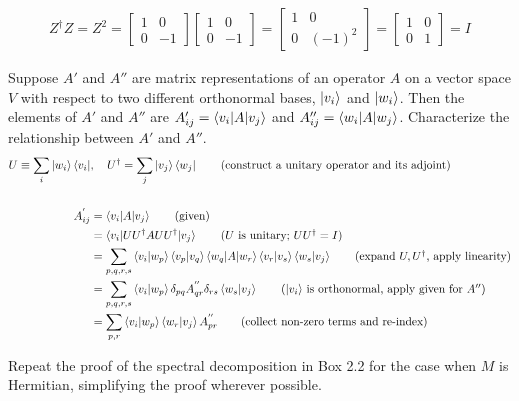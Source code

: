 \begin{align*}
	Z^\dagger Z = Z^2 = \begin{bmatrix}
		1 & 0 \\
		0 & -1
	\end{bmatrix}
	\begin{bmatrix}
		1 & 0 \\
		0 & -1
	\end{bmatrix}
	= \begin{bmatrix}
		1 & 0 \\
		0 & (-1)^2
	\end{bmatrix}
	= \begin{bmatrix}
		1 & 0 \\
		0 & 1
	\end{bmatrix} = I
\end{align*}

 Suppose $A'$ and $A''$ are matrix representations of an operator $A$ on a vector space $V$ with respect to two different orthonormal bases, $\ket{v_i}$ and $\ket{w_i}$.  Then the elements of $A'$ and $A''$ are $A'_{ij} = \braket{v_i | A | v_j}$ and $A''_{ij} = \braket{w_i | A | w_j}$.  Characterize the relationship between $A'$ and $A''$.
\Soln
\begin{align*}
	U \equiv \sum_i \ket{w_i}\bra{v_i}&,\ \  \ U^\dagger=\sum_j \ket{v_j}\bra{w_j} \tag{construct a unitary operator and its adjoint}\\
	\\
	A_{ij}^{'} &= \braket{v_i | A | v_j} \tag{given} \\
	&= \braket{v_i | UU^\dagger A UU^\dagger | v_j} \tag{$U$ is unitary; $UU^\dagger=I$} \\
	&= \sum_{p,q,r,s} \braket{v_i | w_p} \braket{v_p | v_q} \braket{w_q | A | w_r} \braket{v_r | v_s} \braket{w_s | v_j} \tag{expand $U,U^\dagger$, apply linearity}\\
	&= \sum_{p,q,r,s} \braket{v_i | w_p} \delta_{pq} A_{qr}^{''} \delta_{rs}  \braket{w_s | v_j} \tag{$\ket{v_i}$ is orthonormal, apply given for $A''$}\\
	&= \sum_{p,r}  \braket{v_i | w_p}  \braket{w_r | v_j} A_{pr}^{''} \tag{collect non-zero terms and re-index}
\end{align*}


 Repeat the proof of the spectral decomposition in Box 2.2 for the case when $M$ is Hermitian, simplifying the proof wherever possible.
\\

